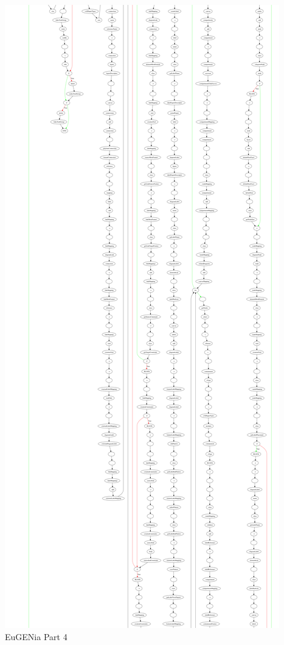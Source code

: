 \begin{minipage}[b]{\textwidth}
\centering
\includegraphics[height=0.97\textheight]{./figures/eug_4.png}
EuGENia Part 4
\end{minipage}
